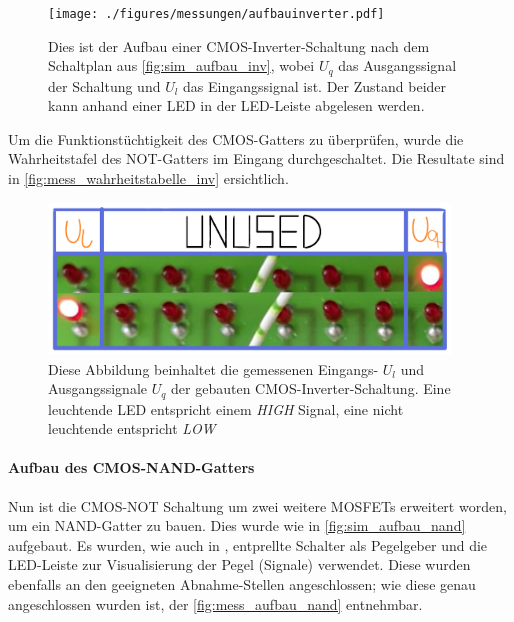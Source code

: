 \documentclass[12pt,english,ngerman]{scrartcl}
\begin{document}
\begin{figure}[H]
  \centering
    \texttt{[image: ./figures/messungen/aufbauinverter.pdf]}
  \caption{Dies ist der Aufbau einer CMOS-Inverter-Schaltung nach dem
  Schaltplan aus \autoref{fig:sim_aufbau_inv}, wobei $U_q$ das Ausgangssignal
  der Schaltung und $U_l$ das Eingangssignal ist. Der Zustand
  beider kann anhand einer LED in der LED-Leiste abgelesen werden.}
  \label{fig:mess_aufbau_inv}
\end{figure}


Um die Funktionstüchtigkeit des CMOS-Gatters zu überprüfen, wurde die
Wahrheitstafel des NOT-Gatters im Eingang durchgeschaltet. Die Resultate
sind in \autoref{fig:mess_wahrheitstabelle_inv} ersichtlich.

\begin{figure}[H]
  \centering
    \includegraphics[width=0.95\textwidth]{./figures/messungen/WahrheitstabelleInverter.pdf}
  \caption{Diese Abbildung beinhaltet die gemessenen Eingangs- $U_l$ und
  Ausgangssignale $U_q$ der gebauten CMOS-Inverter-Schaltung. Eine leuchtende
  LED entspricht einem \textit{HIGH} Signal, eine nicht leuchtende entspricht
  \textit{LOW}} 
\label{fig:mess_wahrheitstabelle_inv}
\end{figure}


\paragraph{Aufbau des CMOS-NAND-Gatters}
Nun ist die CMOS-NOT Schaltung um zwei weitere MOSFETs erweitert worden, um ein
NAND-Gatter zu bauen. Dies wurde wie in \autoref{fig:sim_aufbau_nand} aufgebaut.
Es wurden, wie auch in , entprellte Schalter als
Pegelgeber und die LED-Leiste zur Visualisierung der Pegel (Signale) verwendet.
Diese wurden ebenfalls an den geeigneten Abnahme-Stellen angeschlossen; wie diese genau
angeschlossen wurden ist, der \autoref{fig:mess_aufbau_nand} entnehmbar.
\end{document}
